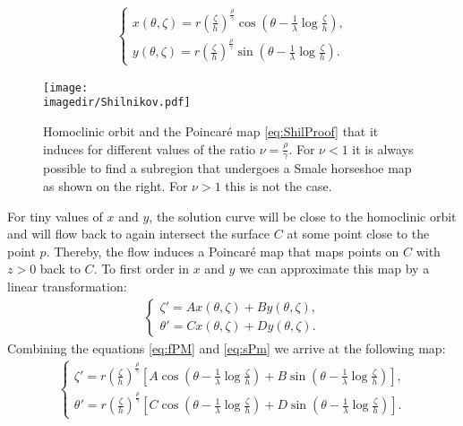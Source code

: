\begin{gather}
\left\{
\begin{matrix}
    x(\theta,\zeta) = r\left(\frac{\zeta}{h}\right)^{\frac{\rho}{\gamma}} \cos\left(\theta - \frac{1}{\lambda} \log \frac{\zeta}{h}\right),\\
    y(\theta,\zeta) = r\left(\frac{\zeta}{h}\right)^{\frac{\rho}{\gamma}} \sin\left(\theta - \frac{1}{\lambda} \log \frac{\zeta}{h}\right).
\end{matrix}\right.    
\label{eq:fPM}
\end{gather}
\begin{figure}
    \texttt{[image: \\imagedir/Shilnikov.pdf]}
    \caption{Homoclinic orbit and the Poincar\'e map \cref{eq:ShilProof} that it induces for different values of the ratio $\nu = \frac{\rho}{\gamma}$. For $\nu<1$ it is always possible to find a subregion that undergoes a Smale horseshoe map as shown on the right. For $\nu>1$ this is not the case.}
    \label{fig:Shilnikov}
\end{figure}
For tiny values of $x$ and $y$, the solution curve will be close to the homoclinic orbit and will flow back to again intersect the surface $C$ at some point close to the point $p$. Thereby, the flow induces a Poincar\'e map that maps points on $C$ with $z > 0$ back to $C$. To first order in $x$ and $y$ we can approximate this map by a linear transformation:
\begin{gather}
    \left\{
    \begin{matrix}
    \zeta' =A x(\theta,\zeta) + B y(\theta,\zeta),\\
    \theta' = C x(\theta,\zeta) + D y(\theta,\zeta).
    \end{matrix} \right. \label{eq:sPm}
\end{gather}
Combining the equations \cref{eq:fPM} and \cref{eq:sPm} we arrive at the following map:
\begin{gather}
        \left\{
    \begin{matrix}
    \zeta' = r\left(\frac{\zeta}{h}\right)^{\frac{\rho}{\gamma}} \left[ A  \cos\left(\theta - \frac{1}{\lambda} \log \frac{\zeta}{h}\right) + B  \sin\left(\theta - \frac{1}{\lambda} \log \frac{\zeta}{h}\right)\right],\\
    \theta' = r\left(\frac{\zeta}{h}\right)^{\frac{\rho}{\gamma}}\left[ C  \cos\left(\theta - \frac{1}{\lambda} \log \frac{\zeta}{h}\right) + D  \sin\left(\theta - \frac{1}{\lambda} \log \frac{\zeta}{h}\right)\right].
    \end{matrix} \right. \label{eq:ShilProof}
\end{gather}
